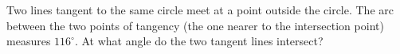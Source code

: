 Two lines tangent to the same circle meet at a point outside the circle. The arc between the two points of tangency (the one nearer to the intersection point) measures $116^\circ$. At what angle do the two tangent lines intersect?
